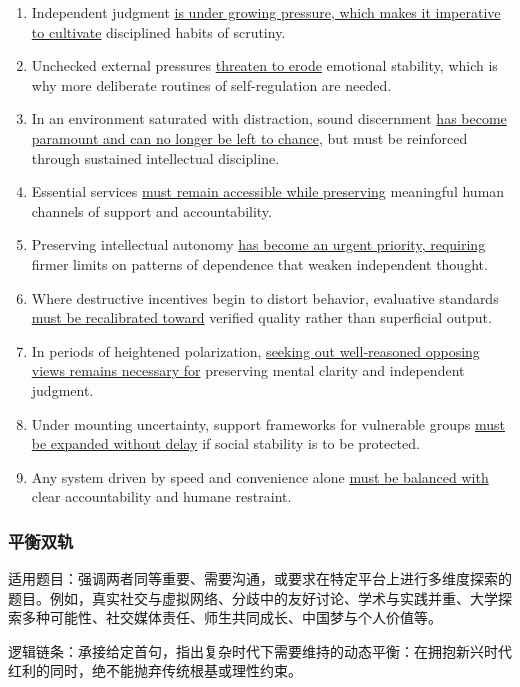 \begin{enumerate}
    \item Independent judgment \underline{is under growing pressure, which makes it imperative to cultivate} disciplined habits of scrutiny.
    \item Unchecked external pressures \underline{threaten to erode} emotional stability, which is why more deliberate routines of self-regulation are needed.
    \item In an environment saturated with distraction, sound discernment \underline{has become paramount and can no longer be left to chance}, but must be reinforced through sustained intellectual discipline.
    \item Essential services \underline{must remain accessible while preserving} meaningful human channels of support and accountability.
    \item Preserving intellectual autonomy \underline{has become an urgent priority, requiring} firmer limits on patterns of dependence that weaken independent thought.
    \item Where destructive incentives begin to distort behavior, evaluative standards \underline{must be recalibrated toward} verified quality rather than superficial output.
    \item In periods of heightened polarization, \underline{seeking out well-reasoned opposing views remains necessary for} preserving mental clarity and independent judgment.
    \item Under mounting uncertainty, support frameworks for vulnerable groups \underline{must be expanded without delay} if social stability is to be protected.
    \item Any system driven by speed and convenience alone \underline{must be balanced with} clear accountability and humane restraint.
\end{enumerate}

\subsubsection{平衡双轨}

适用题目：强调两者同等重要、需要沟通，或要求在特定平台上进行多维度探索的题目。例如，真实社交与虚拟网络、分歧中的友好讨论、学术与实践并重、大学探索多种可能性、社交媒体责任、师生共同成长、中国梦与个人价值等。

逻辑链条：承接给定首句，指出复杂时代下需要维持的动态平衡：在拥抱新兴时代红利的同时，绝不能抛弃传统根基或理性约束。


